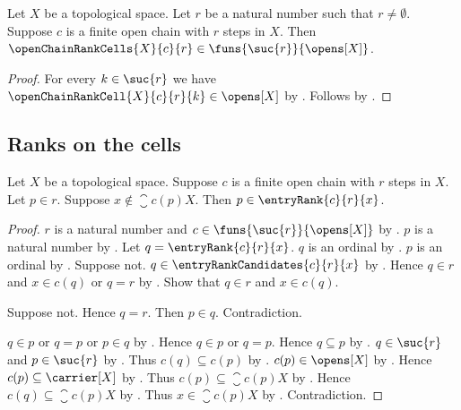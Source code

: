 \begin{theorem}\label{open_chain_rank_cells_typed}
    Let $X$ be a topological space.
    Let $r$ be a natural number such that $r\neq\emptyset$.
    Suppose $c$ is a finite open chain with $r$ steps in $X$.
    Then $\openChainRankCells{X}{c}{r}
        \in\funs{\suc{r}}{\opens[X]}$.
\end{theorem}
\begin{proof}
    For every $k\in\suc{r}$ we have
        $\openChainRankCell{X}{c}{r}{k}\in\opens[X]$
        by .
    Follows by
        .
\end{proof}

\subsection{Ranks on the cells}

\begin{lemma}\label{open_chain_entry_rank_after_closed_entry}
    Let $X$ be a topological space.
    Suppose $c$ is a finite open chain with $r$ steps in $X$.
    Let $p\in r$.
    Suppose $x\notin\closure{c(p)}{X}$.
    Then $p\in\entryRank{c}{r}{x}$.
\end{lemma}
\begin{proof}
    $r$ is a natural number and
        $c\in\funs{\suc{r}}{\opens[X]}$
        by .
    $p$ is a natural number
        by
        .
    Let $q=\entryRank{c}{r}{x}$.
    $q$ is an ordinal by .
    $p$ is an ordinal by .
    Suppose not.
    $q\in\entryRankCandidates{c}{r}{x}$
        by .
    Hence $q\in r$ and $x\in c(q)$ or $q=r$
        by .
    Show that $q\in r$ and $x\in c(q)$.
    \begin{subproof}
        Suppose not.
        Hence $q=r$.
        Then $p\in q$.
        Contradiction.
    \end{subproof}
    $q\in p$ or $q=p$ or $p\in q$
        by .
    Hence $q\in p$ or $q=p$.
    Hence $q\subseteq p$
        by
        .
    $q\in\suc{r}$ and $p\in\suc{r}$ by .
    Thus $c(q)\subseteq c(p)$
        by .
    $c(p)\in\opens[X]$ by .
    Hence $c(p)\subseteq\carrier[X]$
        by .
    Thus $c(p)\subseteq\closure{c(p)}{X}$
        by .
    Hence $c(q)\subseteq\closure{c(p)}{X}$
        by .
    Thus $x\in\closure{c(p)}{X}$ by .
    Contradiction.
\end{proof}

